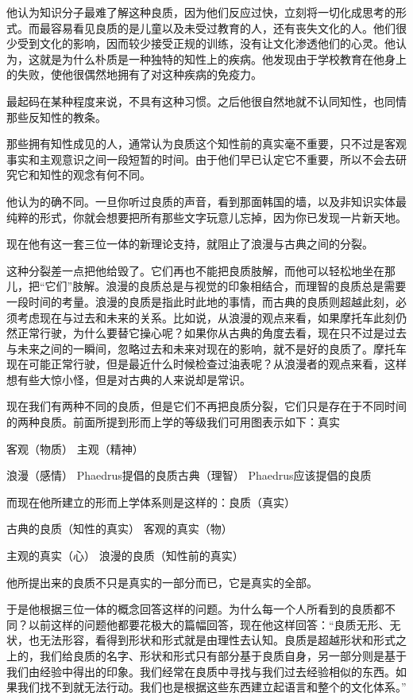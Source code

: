 \documentclass[UTF8]{article}
\begin{document}
\par 他认为知识分子最难了解这种良质，因为他们反应过快，立刻将一切化成思考的形式。而最容易看见良质的是儿童以及未受过教育的人，还有丧失文化的人。他们很少受到文化的影响，因而较少接受正规的训练，没有让文化渗透他们的心灵。他认为，这就是为什么朴质是一种独特的知性上的疾病。他发现由于学校教育在他身上的失败，使他很偶然地拥有了对这种疾病的免疫力。
\par 最起码在某种程度来说，不具有这种习惯。之后他很自然地就不认同知性，也同情那些反知性的教条。
\par 那些拥有知性成见的人，通常认为良质这个知性前的真实毫不重要，只不过是客观事实和主观意识之间一段短暂的时间。由于他们早已认定它不重要，所以不会去研究它和知性的观念有何不同。
\par 他认为的确不同。一旦你听过良质的声音，看到那面韩国的墙，以及非知识实体最纯粹的形式，你就会想要把所有那些文字玩意儿忘掉，因为你已发现一片新天地。
\par 现在他有这一套三位一体的新理论支持，就阻止了浪漫与古典之间的分裂。
\par 这种分裂差一点把他给毁了。它们再也不能把良质肢解，而他可以轻松地坐在那儿，把“它们”肢解。浪漫的良质总是与视觉的印象相结合，而理智的良质总是需要一段时间的考量。浪漫的良质是指此时此地的事情，而古典的良质则超越此刻，必须考虑现在与过去和未来的关系。比如说，从浪漫的观点来看，如果摩托车此刻仍然正常行驶，为什么要替它操心呢？如果你从古典的角度去看，现在只不过是过去与未来之间的一瞬间，忽略过去和未来对现在的影响，就不是好的良质了。摩托车现在可能正常行驶，但是最近什么时候检查过油表呢？从浪漫者的观点来看，这样想有些大惊小怪，但是对古典的人来说却是常识。
\par 现在我们有两种不同的良质，但是它们不再把良质分裂，它们只是存在于不同时间的两种良质。前面所提到形而上学的等级我们可用图表示如下：真实
\par 客观（物质） 主观（精神）
\par 浪漫（感情） Phaedrus提倡的良质古典（理智） Phaedrus应该提倡的良质
\par 而现在他所建立的形而上学体系则是这样的：良质（真实）
\par 古典的良质（知性的真实） 客观的真实（物）
\par 主观的真实（心） 浪漫的良质（知性前的真实）
\par 他所提出来的良质不只是真实的一部分而已，它是真实的全部。
\par 于是他根据三位一体的概念回答这样的问题。为什么每一个人所看到的良质都不同？以前这样的问题他都要花极大的篇幅回答，现在他这样回答：“良质无形、无状，也无法形容，看得到形状和形式就是由理性去认知。良质是超越形状和形式之上的，我们给良质的名字、形状和形式只有部分基于良质自身，另一部分则是基于我们由经验中得出的印象。我们经常在良质中寻找与我们过去经验相似的东西。如果我们找不到就无法行动。我们也是根据这些东西建立起语言和整个的文化体系。”
\end{document}
